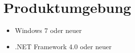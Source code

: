 \section{Produktumgebung}

\begin{itemize}
	\item Windows 7 oder neuer
	\item .NET Framework 4.0 oder neuer
\end{itemize}
